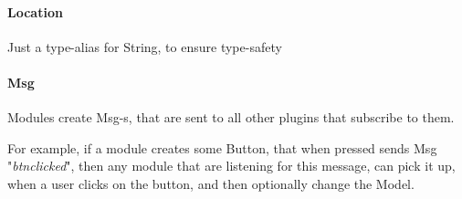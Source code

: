 \paragraph{Location}
Just a type-alias for String, to ensure type-safety


\paragraph{Msg}
Modules create Msg-s, that are sent to all other plugins that subscribe to them.

For example, if a module creates some Button, that when pressed sends
Msg "\textit{btn\-clicked}", then any module that are listening for this message,
can pick it up, when a user clicks on the button, and then optionally change the
Model.
